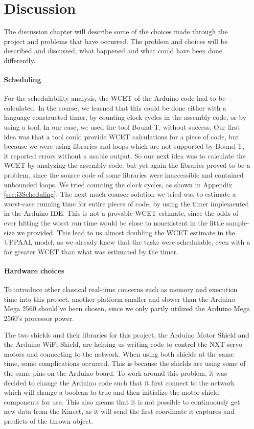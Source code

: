 \chapter{Discussion}
\label{chap:Discussion}
The discussion chapter will describe some of the choices made through the project and problems that have occurred. The problem and choices will be described and discussed, what happened and what could have been done differently. 

\subsubsection{Scheduling}
For the schedulability analysis, the WCET of the Arduino code had to be calculated. In the course, we learned that this could be done either with a language constructed timer, by counting clock cycles in the assembly code, or by using a tool. In our case, we used the tool Bound-T, without success. Our first idea was that a tool could provide WCET calculations for a piece of code, but because we were using libraries and loops which are not supported by Bound-T, it reported errors without a usable output. So our next idea was to calculate the WCET by analyzing the assembly code, but yet again the libraries proved to be a problem, since the source code of some libraries were inaccessible and contained unbounded loops. We tried counting the clock cycles, as shown in Appendix \ref{sec:i3Scheduling}. The next much coarser solution we tried was to estimate a worst-case running time for entire pieces of code, by using the timer implemented in the Arduino IDE. This is not a provable WCET estimate, since the odds of ever hitting the worst run time would be close to nonexistent in the little sample-size we provided. This lead to us almost doubling the WCET estimate in the UPPAAL model, as we already knew that the tasks were schedulable, even with a far greater WCET than what was estimated by the timer.

\subsubsection{Hardware choices}
To introduce other classical real-time concerns such as memory and execution time into this project, another platform smaller and slower than the Arduino Mega 2560 should’ve been chosen, since we only partly utilized the Arduino Mega 2560’s processor power. 

The two shields and their libraries for this project, the Arduino Motor Shield and the Arduino WiFi Shield, are helping us writing code to control the NXT servo motors and connecting to the network. When using both shields at the same time, some complications occurred. This is because the shields are using some of the same pins on the Arduino board. To work around this problem, it was decided to change the Arduino code such that it first connect to the network which will change a boolean to true and then initialize the motor shield components for use. This also means that it is not possible to continuously get new data from the Kinect, as it will send the first coordinate it captures and predicts of the thrown object. \newline

